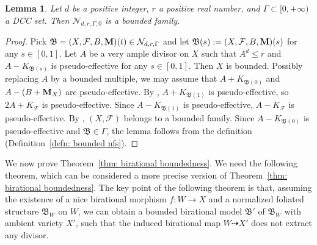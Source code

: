 \documentclass[11pt,reqno]{amsart}
\numberwithin{equation}{section}
\newcommand{\Mm}{{\bf{M}}}
\newcommand{\Bb}{{\mathfrak{B}}}
\newcommand{\Ff}{\mathcal{F}}
\newcommand{\Ii}{\Gamma}
\newtheorem{lem}[thm]{Lemma}
\theoremstyle{definition}
\begin{document}
\begin{lem}\label{lem: drii0 is bounded}
Let $d$ be a positive integer, $r$ a positive real number, and $\Ii\subset [0,+\infty)$ a DCC set. Then $\mathcal{N}_{d,r,\Ii,0}$ is a bounded family.
\end{lem}
\begin{proof}
Pick $\Bb=(X,\Ff,B,\Mm)(t)\in\mathcal{N}_{d,r,\Ii}$ and let $\Bb(s):=(X,\Ff,B,\Mm)(s)$ for any $s\in [0,1]$. Let $A$ be a very ample divisor on $X$ such that $A^d\leq r$ and $A-K_{\Bb(s)}$ is pseudo-effective for any $s\in [0,1]$. Then $X$ is bounded. Possibly replacing $A$ by a bounded multiple, we may assume that $A+K_{\Bb(0)}$ and $A-(B+\Mm_X)$ are pseudo-effective. By \cite[Theorem~5.1]{Cas+25a}, $A+K_{\Bb(1)}$ is pseudo-effective, so $2A+K_{\Ff}$ is pseudo-effective. Since $A-K_{\Bb(1)}$ is pseudo-effective, $A-K_{\Ff}$ is pseudo-effective. By \cite[Proposition~3.36]{Cas+25a}, $(X,\Ff)$ belongs to a bounded family. Since $A-K_{\Bb(0)}$ is pseudo-effective and $\Bb\in\Ii$, the lemma follows from the definition (Definition~\ref{defn: bounded nfs}).
\end{proof}

We now prove Theorem~\ref{thm: birational boundedness}. We need the following theorem, which can be considered a more precise version of Theorem~\ref{thm: birational boundedness}. The key point of the following theorem is that, assuming the existence of a nice birational morphism $f\colon W\rightarrow X$ and a normalized foliated structure $\Bb_W$ on $W$, we can obtain a bounded birational model $\Bb'$ of $\Bb_W$ with ambient variety $X'$, such that the induced birational map $W\dashrightarrow X'$ does not extract any divisor.
\end{document}
